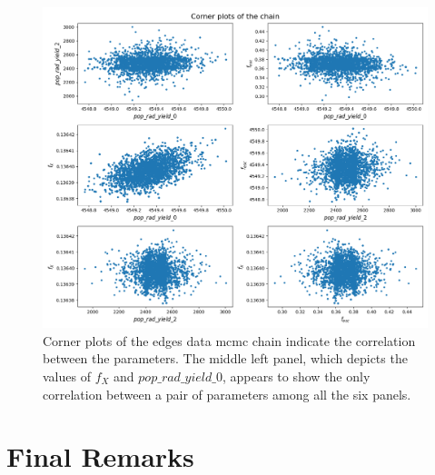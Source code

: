 \documentclass[12pt, TexShade, letterpaper]{report}
\begin{document}
\begin{figure}[h!]
\centering
\includegraphics[scale =0.5]{corner_plots_edges.png}
\caption[Corner plots of the \gls{edges} data \gls{mcmc} chain]{Corner plots of the \gls{edges} data \gls{mcmc} chain indicate the correlation between the parameters. The middle left panel, which depicts the values of $f_X$ and $pop\_rad\_yield\_0$, appears to show the only correlation between a pair of parameters among all the six panels.}
\label{fig:corner_plots_edges}
\end{figure}
\chapter{Final Remarks}
\label{chap:discussion}
\end{document}
